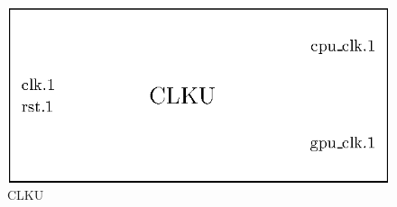 \begin{figure}[H]
    \centering
    \includegraphics[scale=1.0]{Chapter4-GPU_CLKU/res/clku}
    \caption{CLKU}
    \label{fig:clku/clku}
\end{figure}
